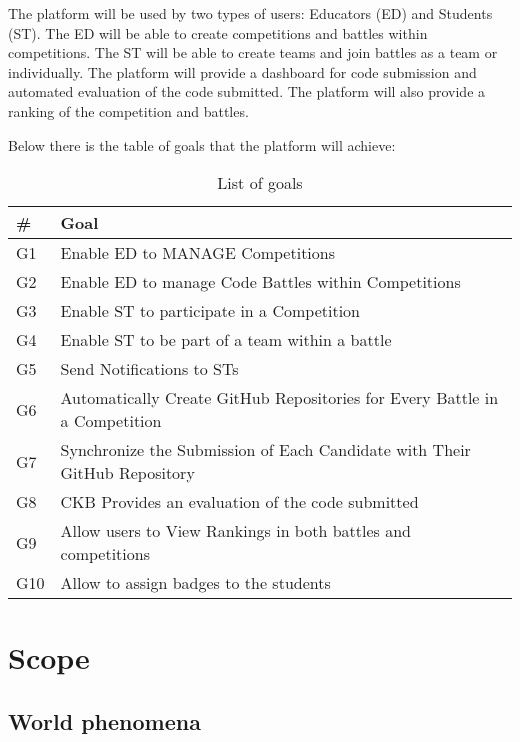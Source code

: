 The platform will be used by two types of users: Educators (ED) and Students (ST). The ED will be able to create competitions and battles within competitions. The ST will be able to create teams and join battles as a team or individually. The platform will provide a dashboard for code submission and automated evaluation of the code submitted. The platform will also provide a ranking of the competition and battles.

Below there is the table of goals that the platform will achieve:
\begin{table}[H]
  \begin{tabular}{|l|l|}
    \hline
    \textbf{\#} & \textbf{Goal}      \\
    \hline
    G1 & Enable ED to MANAGE Competitions \\
    \hline
    G2 & Enable ED to manage Code Battles within Competitions \\
    \hline
    G3 & Enable ST to participate in a Competition \\
    \hline
    G4 & Enable ST to be part of a team within a battle \\
    \hline
    G5 & Send Notifications to STs   \\
    \hline
    G6 & Automatically Create GitHub Repositories for Every Battle in a Competition    \\
    \hline
    G7 & Synchronize the Submission of Each Candidate with Their GitHub Repository   \\
    \hline
    G8 & CKB Provides an evaluation of the code submitted    \\
    \hline
    G9 & Allow users to View Rankings in both battles and competitions   \\
    \hline
    G10 & Allow to assign badges to the students    \\

    \hline


  \end{tabular}
  \caption{List of goals}
  \label{tab:goals}
\end{table}
\pagebreak
\section{Scope}
\label{s:Scope}%

\subsection{World phenomena}
\label{ss:world_phenomena}%

